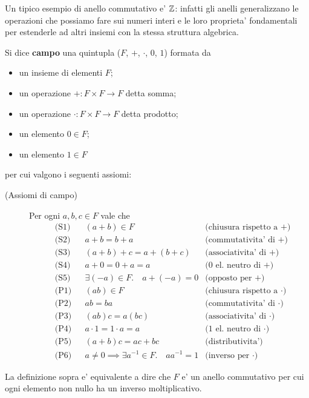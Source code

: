 Un tipico esempio di anello commutativo e' $\mathbb{Z}$: infatti gli anelli generalizzano le operazioni che possiamo fare sui numeri interi e le loro proprieta' fondamentali per estenderle ad altri insiemi con la stessa struttura algebrica.

\begin{definition}[Campo]
    Si dice \textbf{campo} una quintupla ($F$, $+$, $\cdot$, $0$, $1$) formata da
    \begin{itemize}
        \item un insieme di elementi $F$;
        \item un operazione $+ : F \times F \to F$ detta somma;
        \item un operazione $\cdot : F \times F \to F$ detta prodotto;
        \item un elemento $0 \in F$;
        \item un elemento $1 \in F$
    \end{itemize}  per cui valgono i seguenti assiomi: 
    \begin{description}
        \item[(Assiomi di campo)] Per ogni $a, b, c \in F$ vale che
        \begin{align}
            &\text{(S1)}      &&(a+b) \in F           &\text{(chiusura rispetto a $+$)}\\
            &\text{(S2)}      &&a+b = b+a             &\text{(commutativita' di $+$)}\\
            &\text{(S3)}      &&(a+b)+c = a+(b+c)     &\text{(associativita' di $+$)}\\
            &\text{(S4)}      &&a+0=0+a=a             &\text{(0 el. neutro di $+$)}\\
            &\text{(S5)}      &&\exists (-a) \in F. \quad a+(-a) = 0 &\text{(opposto per $+$)}\\
            &\text{(P1)}      &&(ab) \in F            &\text{(chiusura rispetto a $\cdot$)}\\        
            &\text{(P2)}      &&ab = ba               &\text{(commutativita' di $\cdot$)}\\
            &\text{(P3)}      &&(ab)c = a(bc)         &\text{(associativita' di $\cdot$)}\\
            &\text{(P4)}      &&a \cdot 1=1 \cdot a=a &\text{(1 el. neutro di $\cdot$)}\\
            &\text{(P5)}     &&(a+b)c = ac + bc      &\text{(distributivita')} \\
            &\text{(P6)}     &&a \neq 0 \implies \exists a^{-1} \in F. \quad aa^{-1} = 1 &\text{(inverso per $\cdot$)}
        \end{align}
    \end{description} 

    La definizione sopra e' equivalente a dire che $F$ e' un anello commutativo per cui ogni elemento non nullo ha un inverso moltiplicativo.
\end{definition}

